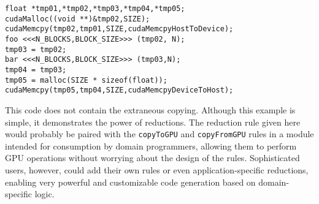 \begin{verbatim}
float *tmp01,*tmp02,*tmp03,*tmp04,*tmp05;
cudaMalloc((void **)&tmp02,SIZE);
cudaMemcpy(tmp02,tmp01,SIZE,cudaMemcpyHostToDevice);
foo <<<N_BLOCKS,BLOCK_SIZE>>> (tmp02, N);
tmp03 = tmp02;
bar <<<N_BLOCKS,BLOCK_SIZE>>> (tmp03,N);
tmp04 = tmp03;
tmp05 = malloc(SIZE * sizeof(float));
cudaMemcpy(tmp05,tmp04,SIZE,cudaMemcpyDeviceToHost);
\end{verbatim}

This code does not contain the extraneous copying. Although this
example is simple, it demonstrates the power of reductions. The
reduction rule given here would probably be paired with the
\texttt{copyToGPU} and \texttt{copyFromGPU} rules in a module
intended for consumption by domain programmers, allowing them to
perform GPU operations without worrying about the design of the
rules. Sophisticated users, however, could add their own rules or
even application-specific reductions, enabling very powerful and
customizable code generation based on domain-specific logic.
